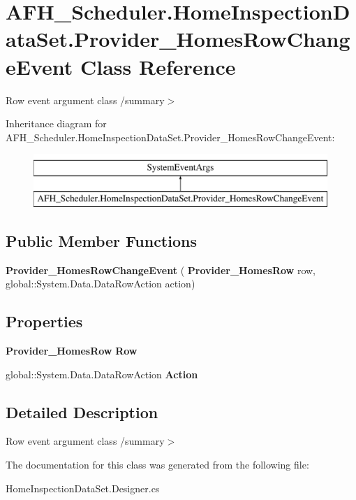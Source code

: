 \section{A\+F\+H\+\_\+\+Scheduler.\+Home\+Inspection\+Data\+Set.\+Provider\+\_\+\+Homes\+Row\+Change\+Event Class Reference}
\label{class_a_f_h___scheduler_1_1_home_inspection_data_set_1_1_provider___homes_row_change_event}


Row event argument class /summary$>$  


Inheritance diagram for A\+F\+H\+\_\+\+Scheduler.\+Home\+Inspection\+Data\+Set.\+Provider\+\_\+\+Homes\+Row\+Change\+Event\+:\begin{figure}[H]
\begin{center}
\leavevmode
\includegraphics[height=2.000000cm]{class_a_f_h___scheduler_1_1_home_inspection_data_set_1_1_provider___homes_row_change_event}
\end{center}
\end{figure}
\subsection*{Public Member Functions}
\begin{DoxyCompactItemize}
\item 
\mbox{\label{class_a_f_h___scheduler_1_1_home_inspection_data_set_1_1_provider___homes_row_change_event_a87ef03713c7b0c6017398521a118b0b1}} 
{\bfseries Provider\+\_\+\+Homes\+Row\+Change\+Event} (\textbf{ Provider\+\_\+\+Homes\+Row} row, global\+::\+System.\+Data.\+Data\+Row\+Action action)
\end{DoxyCompactItemize}
\subsection*{Properties}
\begin{DoxyCompactItemize}
\item 
\mbox{\label{class_a_f_h___scheduler_1_1_home_inspection_data_set_1_1_provider___homes_row_change_event_a0850e2a40ec7ba6a5f5c3d4d7a2e5a7d}} 
\textbf{ Provider\+\_\+\+Homes\+Row} {\bfseries Row}\hspace{0.3cm}{\ttfamily  [get]}
\item 
\mbox{\label{class_a_f_h___scheduler_1_1_home_inspection_data_set_1_1_provider___homes_row_change_event_afb7420ff30d8f3a80364673976e92178}} 
global\+::\+System.\+Data.\+Data\+Row\+Action {\bfseries Action}\hspace{0.3cm}{\ttfamily  [get]}
\end{DoxyCompactItemize}


\subsection{Detailed Description}
Row event argument class /summary$>$ 

The documentation for this class was generated from the following file\+:\begin{DoxyCompactItemize}
\item 
Home\+Inspection\+Data\+Set.\+Designer.\+cs\end{DoxyCompactItemize}
